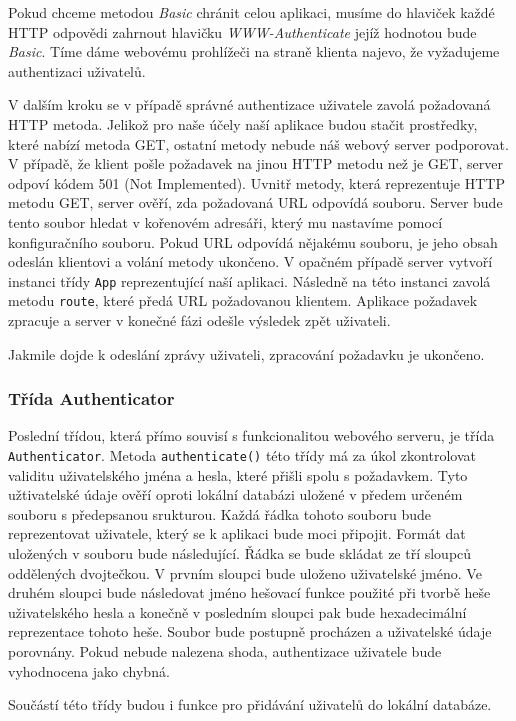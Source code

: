     Pokud chceme metodou \emph{Basic} chránit celou aplikaci, musíme do hlaviček každé HTTP odpovědi zahrnout hlavičku \emph{WWW-Authenticate} jejíž hodnotou bude \emph{Basic}. Tíme dáme webovému prohlížeči na straně klienta najevo, že vyžadujeme authentizaci uživatelů.

    V dalším kroku se v případě správné authentizace uživatele zavolá požadovaná HTTP metoda. Jelikož pro naše účely naší aplikace budou stačit prostředky, které nabízí metoda GET, ostatní metody nebude náš webový server podporovat. V případě, že klient pošle požadavek na jinou HTTP metodu než je GET, server odpoví kódem 501 (Not Implemented). Uvnitř metody, která reprezentuje HTTP metodu GET, server ověří, zda požadovaná URL odpovídá souboru. Server bude tento soubor hledat v kořenovém adresáři, který mu nastavíme pomocí konfiguračního souboru. Pokud URL odpovídá nějakému souboru, je jeho obsah odeslán klientovi a volání metody ukončeno. V opačném případě server vytvoří instanci třídy \verb|App| reprezentující naší aplikaci. Následně na této instanci zavolá metodu \verb|route|, které předá URL požadovanou klientem. Aplikace požadavek zpracuje a server v konečné fázi odešle výsledek zpět uživateli.

    Jakmile dojde k odeslání zprávy uživateli, zpracování požadavku je ukončeno.
    \subsubsection{Třída Authenticator}
    Poslední třídou, která přímo souvisí s funkcionalitou webového serveru, je třída \verb|Authenticator|. Metoda \verb|authenticate()| této třídy má za úkol zkontrolovat validitu uživatelského jména a hesla, které přišli spolu s požadavkem. Tyto užtivatelské údaje ověří oproti lokální databázi uložené v předem určeném souboru s předepsanou srukturou. Každá řádka tohoto souboru bude reprezentovat uživatele, který se k aplikaci bude moci připojit. Formát dat uložených v souboru bude následující. Řádka se bude skládat ze tří sloupců oddělených dvojtečkou. V prvním sloupci bude uloženo uživatelské jméno. Ve druhém sloupci bude následovat jméno hešovací funkce použité při tvorbě heše uživatelského hesla a konečně v posledním sloupci pak bude hexadecimální reprezentace tohoto heše. Soubor bude postupně procházen a uživatelské údaje porovnány. Pokud nebude nalezena shoda, authentizace uživatele bude vyhodnocena jako chybná.

    Součástí této třídy budou i funkce pro přidávání uživatelů do lokální databáze.
